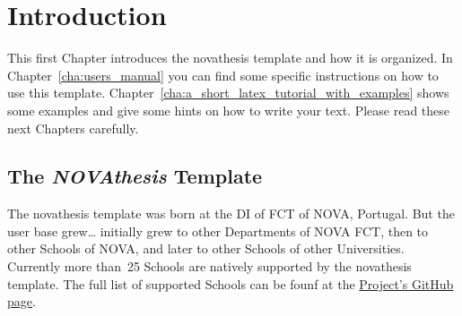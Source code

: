 
%

\chapter{Introduction}
\label{cha:introduction}

%
%
%
%


This first Chapter introduces the \gls{novathesis} template and how it is organized. In Chapter~\ref{cha:users_manual} you can find some specific instructions on how to use this template.  Chapter~\ref{cha:a_short_latex_tutorial_with_examples} shows some examples and give some hints on how to write your text. Please read these next Chapters carefully.

\section{The \emph{NOVAthesis} Template}
\label{sec:a_bit_of_history}

\ntindex[Template]{}

The \gls{novathesis} template was born at the \gls{DI} of  \gls{FCT} of \gls{NOVA}, Portugal.  But the user base grew… initially grew to other Departments of NOVA FCT, then to other Schools of NOVA, and later to other Schools of other Universities.  Currently more than~25 Schools are natively supported by the \gls{novathesis} template.  The full list of supported Schools can be founf at the
\href{https://github.com/joaomlourenco/novathesis}{Project's GitHub page}.

